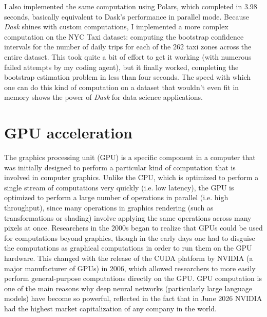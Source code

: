 I also implemented the same computation using Polars, which completed in 3.98 seconds, basically equivalent to Dask's performance in parallel mode.  Because \textit{Dask} shines with custom computations, I implemented a more complex computation on the NYC Taxi dataset: computing the bootstrap confidence intervals for the number of daily trips for each of the 262 taxi zones across the entire dataset.  This took quite a bit of effort to get it working (with numerous failed attempts by my coding agent), but it finally worked, completing the bootstrap estimation problem in less than four seconds.  The speed with which one can do this kind of computation on a dataset that wouldn't even fit in memory shows the power of \textit{Dask} for data science applications.

\section{GPU acceleration}

The graphics processing unit (GPU) is a specific component in a computer that was initially designed to perform a particular kind of computation that is involved in computer graphics.  Unlike the CPU, which is optimized to perform a single stream of computations very quickly (i.e. low latency), the GPU is optimized to perform a large number of operations in parallel (i.e. high throughput), since many operations in graphics rendering (such as transformations or shading) involve applying the same operations across many pixels at once.  Researchers in the 2000s began to realize that GPUs could be used for computations beyond graphics, though in the early days one had to disguise the computations as graphical computations in order to run them on the GPU hardware.  This changed with the release of the CUDA platform by NVIDIA (a major manufacturer of GPUs) in 2006, which allowed researchers to more easily perform general-purpose computations directly on the GPU.  GPU computation is one of the main reasons why deep neural networks (particularly large language models) have become so powerful, reflected in the fact that in June 2026 NVIDIA had the highest market capitalization of any company in the world.


